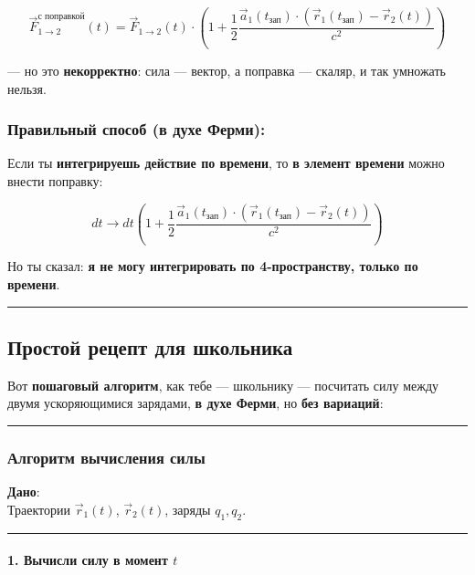 \documentclass[11pt]{article}
\begin{document}
\[
\vec{F}_{1 \to 2}^{\text{с поправкой}}(t) = \vec{F}_{1 \to 2}(t) \cdot \left( 1 + \frac{1}{2} \frac{\vec{a}_1(t_{\text{зап}}) \cdot (\vec{r}_1(t_{\text{зап}}) - \vec{r}_2(t))}{c^2} \right)
\]

--- но это \textbf{некорректно}: сила --- вектор, а поправка --- скаляр,
и так умножать нельзя.

\subsubsection{Правильный способ (в духе Ферми):}
Если ты \textbf{интегрируешь действие по времени}, то \textbf{в элемент
времени} можно внести поправку:

\[
dt \to dt \left( 1 + \frac{1}{2} \frac{\vec{a}_1(t_{\text{зап}}) \cdot (\vec{r}_1(t_{\text{зап}}) - \vec{r}_2(t))}{c^2} \right)
\]

Но ты сказал: \textbf{я не могу интегрировать по 4-пространству, только
по времени}.

\begin{center}\rule{0.5\linewidth}{\linethickness}\end{center}

\subsection{ Простой рецепт для школьника}
Вот \textbf{пошаговый алгоритм}, как тебе --- школьнику --- посчитать
силу между двумя ускоряющимися зарядами, \textbf{в духе Ферми}, но
\textbf{без вариаций}:

\begin{center}\rule{0.5\linewidth}{\linethickness}\end{center}

\subsubsection{ Алгоритм вычисления силы}

\textbf{Дано}:\\
Траектории \(\vec{r}_1(t)\), \(\vec{r}_2(t)\), заряды \(q_1, q_2\).

\begin{center}\rule{0.5\linewidth}{\linethickness}\end{center}

\paragraph{\texorpdfstring{1. Вычисли силу в момент
\(t\)}{1. Вычисли силу в момент t}}
\end{document}
